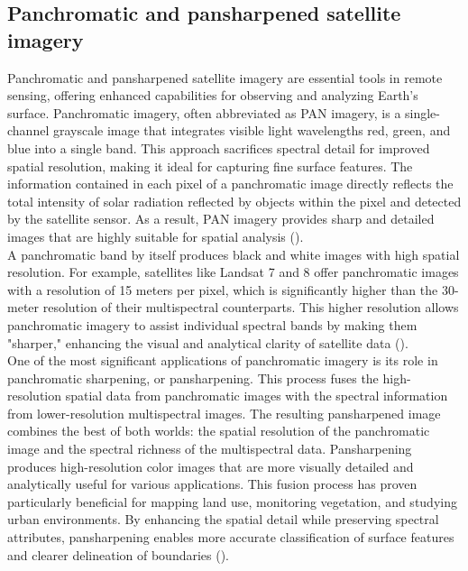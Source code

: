 \documentclass[a4paper,12pt]{article}
\begin{document}
\subsection{Panchromatic and pansharpened satellite imagery}
Panchromatic and pansharpened satellite imagery are essential tools in remote sensing, offering enhanced capabilities for observing and analyzing Earth's surface. Panchromatic imagery, often abbreviated as PAN imagery, is a single-channel grayscale image that integrates visible light wavelengths red, green, and blue into a single band. This approach sacrifices spectral detail for improved spatial resolution, making it ideal for capturing fine surface features. The information contained in each pixel of a panchromatic image directly reflects the total intensity of solar radiation reflected by objects within the pixel and detected by the satellite sensor. As a result, PAN imagery provides sharp and detailed images that are highly suitable for spatial analysis (\cite{shanshan_panchromatic_2022}).\\
A panchromatic band by itself produces black and white images with high spatial resolution. For example, satellites like Landsat 7 and 8 offer panchromatic images with a resolution of 15 meters per pixel, which is significantly higher than the 30-meter resolution of their multispectral counterparts. This higher resolution allows panchromatic imagery to assist individual spectral bands by making them "sharper," enhancing the visual and analytical clarity of satellite data (\cite{eos_data_analytic_panchromatic_2021}).\\
One of the most significant applications of panchromatic imagery is its role in panchromatic sharpening, or pansharpening. This process fuses the high-resolution spatial data from panchromatic images with the spectral information from lower-resolution multispectral images. The resulting pansharpened image combines the best of both worlds: the spatial resolution of the panchromatic image and the spectral richness of the multispectral data. Pansharpening produces high-resolution color images that are more visually detailed and analytically useful for various applications. This fusion process has proven particularly beneficial for mapping land use, monitoring vegetation, and studying urban environments. By enhancing the spatial detail while preserving spectral attributes, pansharpening enables more accurate classification of surface features and clearer delineation of boundaries (\cite{mcauliffe_panchromatic_2021}).\\
\end{document}
